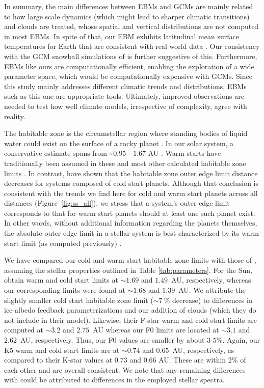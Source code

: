 \documentclass[fleqn,usenatbib]{mnras}
\begin{document}
In summary, the main differences between EBMs and GCMs are mainly related to how large scale dynamics (which might lead to sharper climatic transitions) and clouds are treated, whose spatial and vertical distributions are not computed in most EBMs. In spite of that, our EBM exhibits latitudinal mean surface temperatures for Earth that are consistent with real world data \citep{RamirezLevi2018}. Our consistency with the GCM snowball simulations of \citet{hoffman_snowball_2017} is further suggestive of this. Furthermore, EBMs like ours are computationally efficient, enabling the exploration of a wide parameter space, which would be computationally expensive with GCMs. Since this study mainly addresses different climatic trends and distributions, EBMs such as this one are appropriate tools. Ultimately, improved observations are needed to test how well climate models, irrespective of complexity, agree with reality.

The habitable zone is the circumstellar region where standing bodies of liquid water could exist on the surface of a rocky planet \citep{Ramirez2018}. In our solar system, a conservative estimate spans from \textasciitilde $0.95$ - $1.67$ AU \citep{kasting1993, Ramirez2018}. Warm starts have traditionally been assumed in these
and most other calculated habitable zone limits \citep{kasting1993, pierregaidos2011, KumarKopparapu2013,zsom2013, ramirez2017, ramirez2020complex, ramirez2020}. 
In contrast, \citet{kadoya_outer_2019} have shown that the habitable zone outer edge limit distance decreases for systems composed of cold start planets.  Although that conclusion is consistent with the trends we find here for cold and warm start planets across all distances (Figure~\ref{fig:ss_all}), we stress that a system's outer edge limit corresponds to that for warm start planets should at least one such planet exist. In other words, without additional information regarding the planets themselves, the absolute outer edge limit in a stellar system is best characterized by its warm start limit (as computed previously) \citep{kasting1993, KumarKopparapu2013}.

We have compared our cold and warm start habitable zone limits with those of \citet{kadoya_outer_2019}, assuming the stellar properties outlined in Table \ref{tab:parameters}. For the Sun, \citet{kadoya_outer_2019} obtain warm and cold start limits at $\sim1.69$ and $1.49$~AU, respectively, whereas our corresponding limits were found at $\sim 1.68$ and $1.39$~AU. We
attribute the slightly smaller cold start habitable zone limit ($\sim 7~\%$ decrease) to differences in ice-albedo feedback parameterizations and our addition of clouds (which they do not include in their model).
Likewise, their F-star warm and cold start limits are computed at $\sim 3.2$ and $2.75$~AU whereas our F0 limits are located at $\sim 3.1$ and $2.62$~AU, respectively. Thus, our F0 values are smaller by  about $3$-$5\%$. Again, our K5 warm and cold start limits are at $\sim 0.74$ and $0.65$~AU, respectively, as compared to their K-star values at 0.73 and 0.66 AU. These are within 2$\%$ of each other and are overall consistent.  We note that any remaining differences with \citet{kadoya_outer_2019} could be attributed to differences in the employed stellar spectra.
\end{document}
